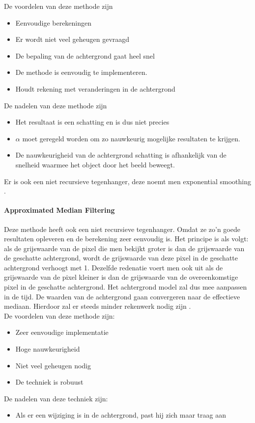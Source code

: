De voordelen van deze methode zijn
\begin{itemize}
	\item Eenvoudige berekeningen
	\item Er wordt niet veel geheugen gevraagd
	\item De bepaling van de achtergrond gaat heel snel
	\item De methode is eenvoudig te implementeren.
	\item Houdt rekening met veranderingen in de achtergrond
\end{itemize}
De nadelen van deze methode zijn
\begin{itemize}
	\item Het resultaat is een schatting en is dus niet precies
	\item $\alpha$ moet geregeld worden om zo nauwkeurig mogelijke resultaten te krijgen.
	\item De nauwkeurigheid van de achtergrond schatting is afhankelijk van de snelheid waarmee het object door het beeld beweegt.
\end{itemize}
Er is ook een niet recursieve tegenhanger, deze noemt men exponential smoothing \cite{bibSDB}.


\paragraph{Approximated Median Filtering}
\label{refAMF}
Deze methode heeft ook een niet recursieve tegenhanger. Omdat ze zo'n goede resultaten opleveren en de berekening zeer eenvoudig is. Het principe is als volgt: als de grijswaarde van de pixel die men bekijkt groter is dan de grijswaarde van de geschatte achtergrond, wordt de grijswaarde van deze pixel in de geschatte achtergrond verhoogt met 1. Dezelfde redenatie voert men ook uit als de grijswaarde van de pixel kleiner is dan de grijswaarde van de overeenkomstige pixel in de geschatte achtergrond. Het achtergrond model zal dus mee aanpassen in de tijd. De waarden van de achtergrond gaan convergeren naar de effectieve mediaan. Hierdoor zal er steeds minder rekenwerk nodig zijn \cite{bibVTS}.\\
De voordelen van deze methode zijn:
\begin{itemize}
	\item Zeer eenvoudige implementatie
	\item Hoge nauwkeurigheid
	\item Niet veel geheugen nodig
	\item De techniek is robuust
\end{itemize} 
De nadelen van deze techniek zijn:
\begin{itemize}
	\item Als er een wijziging is in de achtergrond, past hij zich maar traag aan
\end{itemize}

